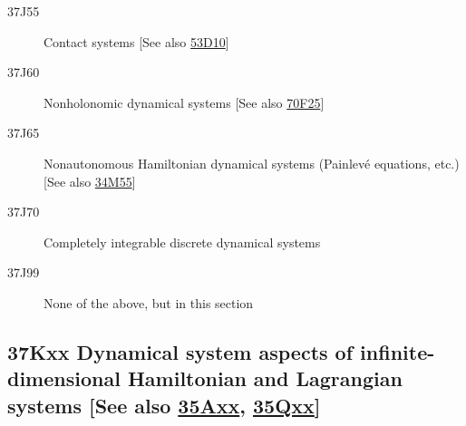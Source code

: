 \documentclass[letterpaper]{article}
\begin{document}
\begin{description}
\item [37J55]\label{37J55} Contact systems [See also \hyperref[53D10]{53D10}]
\item [37J60]\label{37J60} Nonholonomic  dynamical systems [See also \hyperref[70F25]{70F25}]
\item [37J65]\label{37J65} Nonautonomous Hamiltonian dynamical systems (Painlev\'e equations, etc.) [See also \hyperref[34M55]{34M55}]
\item [37J70]\label{37J70} Completely integrable discrete  dynamical systems
\item [37J99]\label{37J99} None of the above, but in this section
\end{description}
\subsection*{37Kxx Dynamical system aspects of infinite-dimensional Hamiltonian and Lagrangian systems [See also \hyperref[35Axx]{35Axx}, \hyperref[35Qxx]{35Qxx}] }\label{37Kxx}
\end{document}

